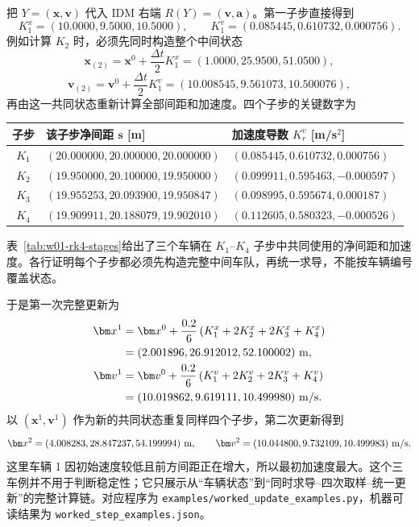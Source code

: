 \documentclass[11pt,a4paper,openany]{book}
\numberwithin{equation}{chapter}
\numberwithin{figure}{chapter}
\numberwithin{table}{chapter}
\newcommand{\tabletext}[2]{%
  \par\smallskip\noindent
  表~\ref{#1}给出了#2
  \par\smallskip
}
\begin{document}
把 $Y=(\bm x,\bm v)$ 代入 IDM 右端 $R(Y)=(\bm v,\bm a)$。第一子步直接得到
\begin{equation}
K_1^x=(10.0000,9.5000,10.5000),\qquad
K_1^v=(0.085445,0.610732,0.000756).
\label{eq:w01-k1}
\end{equation}
例如计算 $K_2$ 时，必须先同时构造整个中间状态
\[
\bm x_{(2)}=\bm x^0+\frac{\Delta t}{2}K_1^x=(1.0000,25.9500,51.0500),
\]
\[
\bm v_{(2)}=\bm v^0+\frac{\Delta t}{2}K_1^v
=(10.008545,9.561073,10.500076),
\]
再由这一共同状态重新计算全部间距和加速度。四个子步的关键数字为
\begin{center}
\small
{}
\label{tab:w01-rk4-stages}
\begin{tabular}{c p{5.2cm} p{5.2cm}}
\toprule
\textbf{子步} & \textbf{该子步净间距 $\bm s$ [m]} & \textbf{加速度导数 $K_r^v$ [m/s$^2$]}\\
\midrule
$K_1$ & $(20.000000,20.000000,20.000000)$
& $(0.085445,0.610732,0.000756)$\\
$K_2$ & $(19.950000,20.100000,19.950000)$
& $(0.099911,0.595463,-0.000597)$\\
$K_3$ & $(19.955253,20.093900,19.950847)$
& $(0.098995,0.595674,0.000187)$\\
$K_4$ & $(19.909911,20.188079,19.902010)$
& $(0.112605,0.580323,-0.000526)$\\
\bottomrule
\end{tabular}
\end{center}
\tabletext{tab:w01-rk4-stages}{三个车辆在 $K_1$--$K_4$ 子步中共同使用的净间距和加速度。各行证明每个子步都必须先构造完整中间车队，再统一求导，不能按车辆编号覆盖状态。}
于是第一次完整更新为
\begin{align}
\bm x^1&=\bm x^0+\frac{0.2}{6}
\left(K_1^x+2K_2^x+2K_3^x+K_4^x\right)
\notag\\
&=(2.001896,26.912012,52.100002)\ {\rm m},\\
\bm v^1&=\bm v^0+\frac{0.2}{6}
\left(K_1^v+2K_2^v+2K_3^v+K_4^v\right)
\notag\\
&=(10.019862,9.619111,10.499980)\ {\rm m/s}.
\label{eq:w01-first-update}
\end{align}
以 $(\bm x^1,\bm v^1)$ 作为新的共同状态重复同样四个子步，第二次更新得到
\begin{equation}
\bm x^2=(4.008283,28.847237,54.199994)\ {\rm m},\qquad
\bm v^2=(10.044800,9.732109,10.499983)\ {\rm m/s}.
\label{eq:w01-second-update}
\end{equation}
这里车辆 1 因初始速度较低且前方间距正在增大，所以最初加速度最大。这个三车例并不用于判断稳定性；它只展示从“车辆状态”到“同时求导--四次取样--统一更新”的完整计算链。对应程序为
\texttt{examples/worked\_update\_examples.py}，机器可读结果为
\texttt{worked\_step\_examples.json}。
\end{document}
